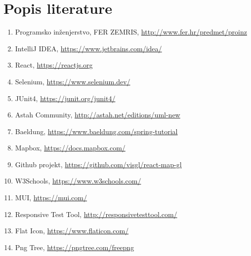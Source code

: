 \chapter*{Popis literature}
		
		
		\begin{enumerate}
			
			
			\item  Programsko inženjerstvo, FER ZEMRIS, \url{http://www.fer.hr/predmet/proinz}

            \item  IntelliJ IDEA, 
           \url{https://www.jetbrains.com/idea/}

           \item  React, 
           \url{https://reactjs.org}

            \item  Selenium, 
           \url{https://www.selenium.dev/}

           \item  JUnit4, 
           \url{https://junit.org/junit4/}

           \item  Astah Community, 
           \url{http://astah.net/editions/uml-new}

           \item  Baeldung, 
           \url{https://www.baeldung.com/spring-tutorial}

           \item  Mapbox, 
           \url{https://docs.mapbox.com/}

            \item  Github projekt, 
           \url{https://github.com/visgl/react-map-gl}

           \item  W3Schools, 
           \url{https://www.w3schools.com/}

           \item  MUI, 
           \url{https://mui.com/}

           \item  Responsive Test Tool, 
           \url{http://responsivetesttool.com/}
           
            \item  Flat Icon, 
           \url{https://www.flaticon.com/}

            \item  Png Tree, 
           \url{https://pngtree.com/freepng}


\end{enumerate}
